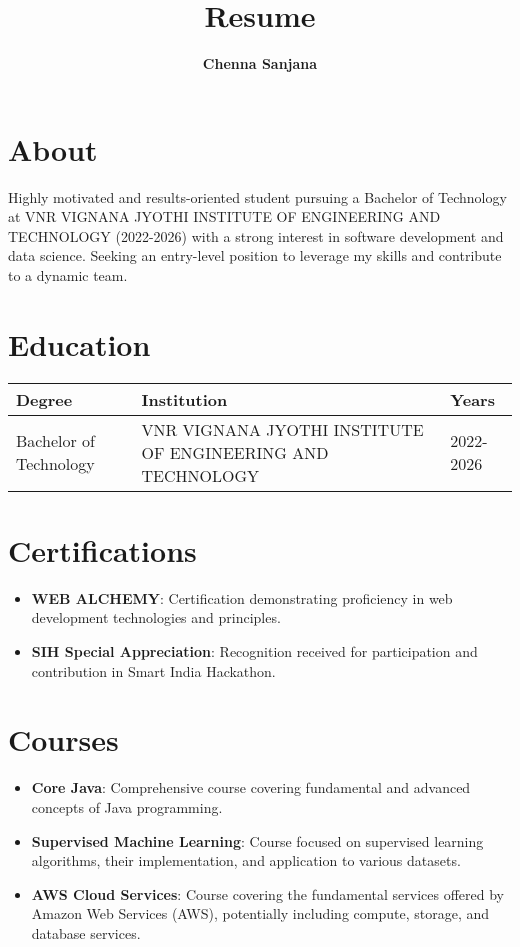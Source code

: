 \documentclass[a4paper, 12pt]{article}
\begin{document}
\title{\textbf{Resume}}
\author{\textbf{Chenna Sanjana}}
\date{}
\maketitle



\section*{About}
Highly motivated and results-oriented student pursuing a Bachelor of Technology at VNR VIGNANA JYOTHI INSTITUTE OF ENGINEERING AND TECHNOLOGY (2022-2026) with a strong interest in software development and data science. Seeking an entry-level position to leverage my skills and contribute to a dynamic team.

\section*{Education}
\renewcommand{\arraystretch}{1.3} %
\begin{longtable}{|p{4cm}|p{7cm}|p{3cm}|} %
    \hline
    \textbf{Degree} & \textbf{Institution} & \textbf{Years} \\ 
    \hline
    Bachelor of Technology & VNR VIGNANA JYOTHI INSTITUTE OF ENGINEERING AND TECHNOLOGY & 2022-2026 \\ \hline
\end{longtable}

\section*{Certifications}
\begin{itemize}
    \item \textbf{WEB ALCHEMY}: Certification demonstrating proficiency in web development technologies and principles.
\item \textbf{SIH Special Appreciation}: Recognition received for participation and contribution in Smart India Hackathon.
\end{itemize}

\section*{Courses}
\begin{itemize}
    \item \textbf{Core Java}: Comprehensive course covering fundamental and advanced concepts of Java programming.
\item \textbf{Supervised Machine Learning}: Course focused on supervised learning algorithms, their implementation, and application to various datasets.
\item \textbf{AWS Cloud Services}: Course covering the fundamental services offered by Amazon Web Services (AWS), potentially including compute, storage, and database services.
\end{itemize}
\end{document}
